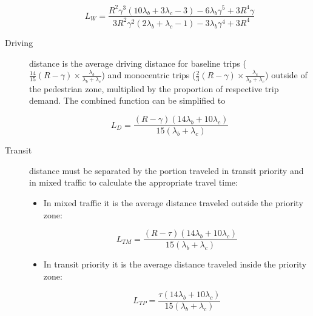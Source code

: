 \documentclass{article}
\begin{document}
\begin{description}
\begin{equation}
L_W = \frac{R^{2}\gamma^{3}\left(10\lambda_{b}+3\lambda_{c}-3\right)-6\lambda_{b}\gamma^{5}+3R^{4}\gamma}{3R^{2}\gamma^{2}\left(2\lambda_{b}+\lambda_{c}-1\right)-3\lambda_{b}\gamma^{4}+3R^{4}}
\end{equation}





\item[Driving] distance is the average driving distance for baseline trips ($\frac{14}{15}(R-\gamma)\times\frac{\lambda_b}{\lambda_b + \lambda_c}$) and monocentric trips ($\frac{2}{3}(R-\gamma)\times\frac{\lambda_c}{\lambda_b + \lambda_c}$) outside of the pedestrian zone, multiplied by the proportion of respective trip demand. The combined function can be simplified to

\begin{equation}
L_D = \frac{(R-\gamma)(14\lambda_b + 10\lambda_c)}{15(\lambda_b + \lambda_c)}
\end{equation}

\item[Transit] distance must be separated by the portion traveled in transit priority and in mixed traffic to calculate the appropriate travel time:

\begin{itemize}
    \item In mixed traffic it is the average distance traveled outside the priority zone:
    
    \begin{equation}
        L_{TM} = \frac{(R-\tau)(14\lambda_b + 10\lambda_c)}{15(\lambda_b + \lambda_c)}
    \end{equation}
        
    \item In transit priority it is the average distance traveled inside the priority zone:
    
    \begin{equation}
        L_{TP} = \frac{\tau (14\lambda_b + 10\lambda_c)}{15(\lambda_b + \lambda_c)}
    \end{equation}
    
\end{itemize}

\end{description}
\end{document}
